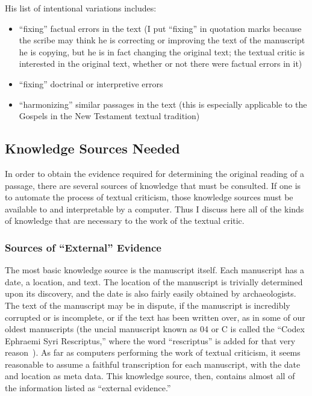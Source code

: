 \documentclass[onecolumn, 12pt]{article}
\begin{document}
His list of intentional variations includes:

\begin{itemize}
  \item ``fixing'' factual errors in the text (I put ``fixing'' in quotation
	marks because the scribe may think he is correcting or improving the text
	of the manuscript he is copying, but he is in fact changing the original
	text; the textual critic is interested in the original text, whether or not
	there were factual errors in it)
  \item ``fixing'' doctrinal or interpretive errors
  \item ``harmonizing'' similar passages in the text (this is especially
	applicable to the Gospels in the New Testament textual tradition)
\end{itemize}

\subsection{Knowledge Sources Needed}

In order to obtain the evidence required for determining the original reading
of a passage, there are several sources of knowledge that must be consulted.
If one is to automate the process of textual criticism, those knowledge sources
must be available to and interpretable by a computer.  Thus I discuss here all
of the kinds of knowledge that are necessary to the work of the textual critic.

\subsubsection{Sources of ``External'' Evidence}

The most basic knowledge source is the manuscript itself.  Each manuscript has
a date, a location, and text.  The location of the manuscript is trivially
determined upon its discovery, and the date is also fairly easily obtained by
archaeologists.  The text of the manuscript may be in dispute, if the
manuscript is incredibly corrupted or is incomplete, or if the text has been
written over, as in some of our oldest manuscripts (the uncial manuscript known
as 04 or C is called the ``Codex Ephraemi Syri Rescriptus,'' where the word
``rescriptus'' is added for that very reason~\cite[p.
109]{aland-text-of-the-new-testament}).  As far as computers performing the
work of textual criticism, it seems reasonable to assume a faithful
transcription for each manuscript, with the date and location as meta data.
This knowledge source, then, contains almost all of the information listed as
``external evidence.''
\end{document}

